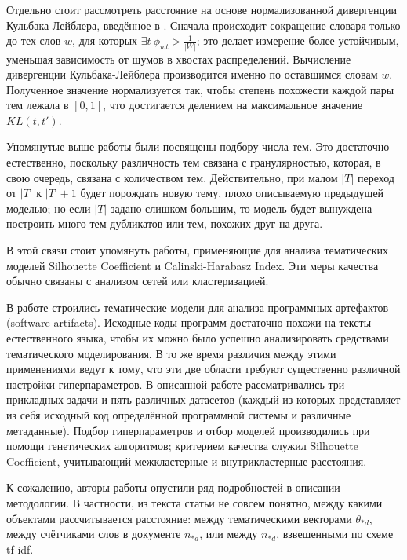 Отдельно стоит рассмотреть расстояние на основе нормализованной дивергенции Кульбака-Лейблера, введённое в \cite{koltcov2014latent}. Сначала происходит сокращение словаря только до тех слов $w$, для которых $\exists t \  \phi_{wt} > \frac{1}{|W|}$; это делает измерение более устойчивым, уменьшая зависимость от шумов в хвостах распределений. Вычисление дивергенции Кульбака-Лейблера производится именно по оставшимся словам $w$. Полученное значение нормализуется так, чтобы степень похожести каждой пары тем лежала в $[0, 1]$, что достигается делением на максимальное значение $KL(t, t')$.

Упомянутые выше работы были посвящены подбору числа тем. Это достаточно естественно, поскольку различность тем связана с гранулярностью, которая, в свою очередь, связана с количеством тем. Действительно, при малом $|T|$ переход от $|T|$ к $|T|+1$ будет порождать новую тему, плохо описываемую предыдущей моделью; но если $|T|$ задано слишком большим, то модель будет вынуждена построить много тем-дубликатов или тем, похожих друг на друга.

В этой связи стоит упомянуть работы, применяющие для анализа тематических моделей Silhouette Coefficient и Calinski-Harabasz Index. Эти меры качества обычно связаны с анализом сетей или кластеризацией.

В работе \cite{panichella2013effectively} строились тематические модели для анализа программных артефактов (software artifacts). Исходные коды программ достаточно похожи на тексты естественного языка, чтобы их можно было успешно анализировать средствами тематического моделирования. В то же время различия между этими применениями ведут к тому, что эти две области требуют существенно различной настройки гиперпараметров. В описанной работе рассматривались три прикладных задачи и пять различных датасетов (каждый из которых представляет из себя исходный код определённой программной системы и различные метаданные). Подбор гиперпараметров и отбор моделей производились при помощи генетических алгоритмов; критерием качества служил Silhouette Coefficient, учитывающий межкластерные и внутрикластерные расстояния.

К сожалению, авторы работы \cite{panichella2013effectively} опустили ряд подробностей в описании методологии. В частности, из текста статьи не совсем понятно, между какими объектами рассчитывается расстояние: между тематическими векторами $\theta_{\ast d}$, между счётчиками слов в документе $n_{\ast d}$, или между $n_{\ast d}$, взвешенными по схеме tf-idf.

